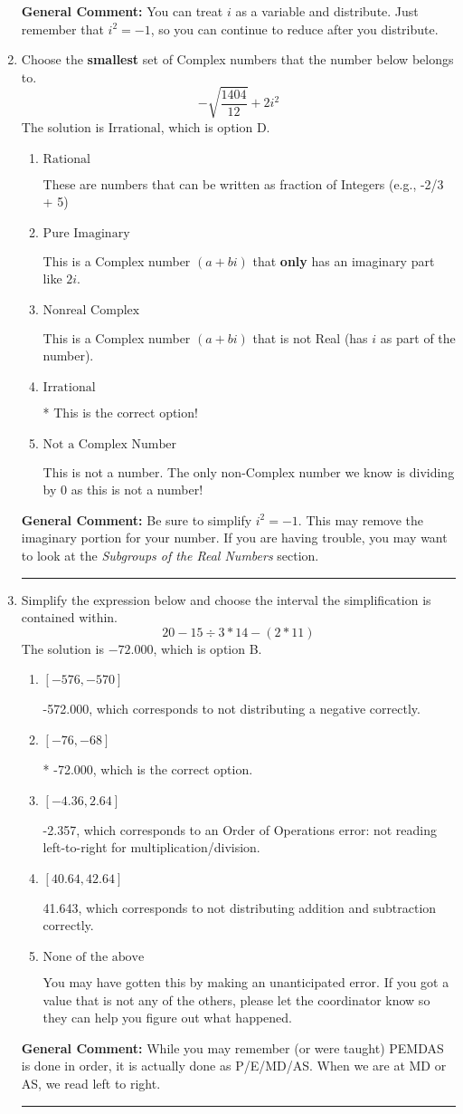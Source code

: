 \documentclass{extbook}[14pt]
\newcommand{\litem}[1]{\item #1

\rule{\textwidth}{0.4pt}}
\begin{document}
\begin{enumerate}
{\textbf{General Comment:} You can treat $i$ as a variable and distribute. Just remember that $i^2=-1$, so you can continue to reduce after you distribute.
}
\litem{
Choose the \textbf{smallest} set of Complex numbers that the number below belongs to.
\[ -\sqrt{\frac{1404}{12}}+2i^2 \]
The solution is \( \text{Irrational} \), which is option D.\begin{enumerate}[label=\Alph*.]
\item \( \text{Rational} \)

These are numbers that can be written as fraction of Integers (e.g., -2/3 + 5)
\item \( \text{Pure Imaginary} \)

This is a Complex number $(a+bi)$ that \textbf{only} has an imaginary part like $2i$.
\item \( \text{Nonreal Complex} \)

This is a Complex number $(a+bi)$ that is not Real (has $i$ as part of the number).
\item \( \text{Irrational} \)

* This is the correct option!
\item \( \text{Not a Complex Number} \)

This is not a number. The only non-Complex number we know is dividing by 0 as this is not a number!
\end{enumerate}

\textbf{General Comment:} Be sure to simplify $i^2 = -1$. This may remove the imaginary portion for your number. If you are having trouble, you may want to look at the \textit{Subgroups of the Real Numbers} section.
}
\litem{
Simplify the expression below and choose the interval the simplification is contained within.
\[ 20 - 15 \div 3 * 14 - (2 * 11) \]
The solution is \( -72.000 \), which is option B.\begin{enumerate}[label=\Alph*.]
\item \( [-576, -570] \)

 -572.000, which corresponds to not distributing a negative correctly.
\item \( [-76, -68] \)

* -72.000, which is the correct option.
\item \( [-4.36, 2.64] \)

 -2.357, which corresponds to an Order of Operations error: not reading left-to-right for multiplication/division.
\item \( [40.64, 42.64] \)

 41.643, which corresponds to not distributing addition and subtraction correctly.
\item \( \text{None of the above} \)

 You may have gotten this by making an unanticipated error. If you got a value that is not any of the others, please let the coordinator know so they can help you figure out what happened.
\end{enumerate}

\textbf{General Comment:} While you may remember (or were taught) PEMDAS is done in order, it is actually done as P/E/MD/AS. When we are at MD or AS, we read left to right.
}
\end{enumerate}
\end{document}
